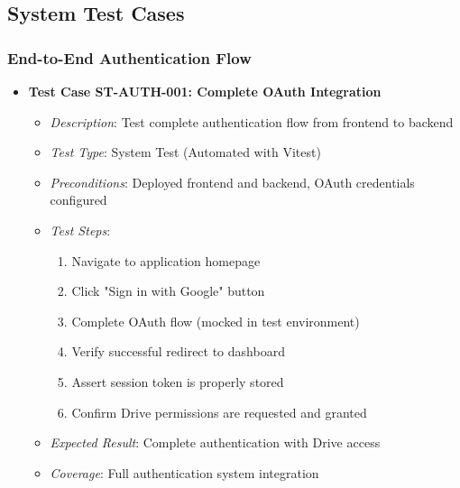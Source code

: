 \documentclass[12pt]{article}
\begin{document}
\subsection{System Test Cases}

\subsubsection{End-to-End Authentication Flow}
\begin{itemize}
  \item \textbf{Test Case ST-AUTH-001: Complete OAuth Integration}
    \begin{itemize}
      \item \textit{Description}: Test complete authentication flow from frontend to backend
      \item \textit{Test Type}: System Test (Automated with Vitest)
      \item \textit{Preconditions}: Deployed frontend and backend, OAuth credentials configured
      \item \textit{Test Steps}:
        \begin{enumerate}
          \item Navigate to application homepage
          \item Click "Sign in with Google" button
          \item Complete OAuth flow (mocked in test environment)
          \item Verify successful redirect to dashboard
          \item Assert session token is properly stored
          \item Confirm Drive permissions are requested and granted
        \end{enumerate}
      \item \textit{Expected Result}: Complete authentication with Drive access
      \item \textit{Coverage}: Full authentication system integration
    \end{itemize}
\end{itemize}
\end{document}
